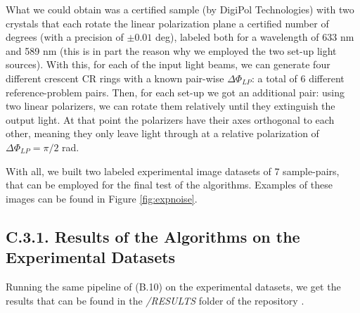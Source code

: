 \documentclass[11pt, a4paper, twoside]{article} %
\begin{document}
What we could obtain was a certified sample (by DigiPol Technologies) with two crystals that each rotate the linear polarization plane a certified number of degrees (with a precision of $\pm 0.01$ deg), labeled both for a wavelength of 633 nm and 589 nm (this is in part the reason why we employed the two set-up light sources). With this, for each of the input light beams, we can generate four different crescent CR rings with a known pair-wise $\Delta \Phi_{LP}$: a total of 6 different reference-problem pairs. Then, for each set-up we got an additional pair: using two linear polarizers, we can rotate them relatively until they extinguish the output light. At that point the polarizers have their axes orthogonal to each other, meaning they only leave light through at a relative polarization of $\Delta \Phi_{LP}=\pi/2$ rad.

With all, we built two labeled experimental image datasets of 7 sample-pairs, that can be employed for the final test of the algorithms. Examples of these images can be found in Figure \ref{fig:expnoise}.	\vspace{-0.35cm}

\subsection*{C.3.1. Results of the Algorithms on the Experimental Datasets}\vspace{-0.05cm}
Running the same pipeline of (B.10) on the experimental datasets, we get the results that can be found in the {\em /RESULTS} folder of the repository \cite{github}.
\end{document}
